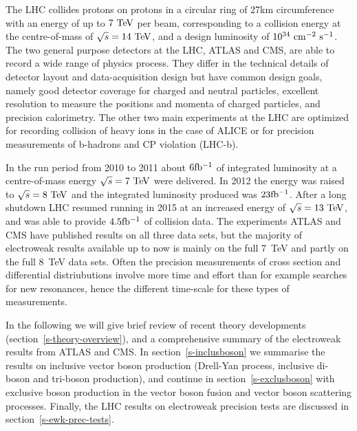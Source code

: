 The LHC collides protons on protons in a circular ring of 27\;km 
circumference with an energy of up to $7\TeV$ per beam, corresponding
to a collision energy at the centre-of-mass of $\rts=14\TeV$, and a 
design luminosity of $10^{34}\cm^{-2}\s^{-1}$. 
The two general purpose detectors at the LHC, ATLAS and CMS, are able to
record a wide range of physics process. They differ in the technical details of detector
layout and data-acquisition design but have common design goals, namely 
good detector coverage for charged and neutral particles, excellent resolution to measure
the positions and momenta of charged particles, and precision calorimetry. The other two
main experiments at the LHC are optimized for recording collision of heavy ions in the 
case of ALICE or for precision measurements of b-hadrons and CP violation (LHC-b).

In the run period from 2010 to 2011 about $6\mbox{fb$^{-1}$}$ of integrated
luminosity at a centre-of-mass energy $\rts=7\TeV$ were delivered. In 
2012 the energy was raised to $\rts=8\TeV$ and the integrated luminosity 
produced was $23\mbox{fb$^{-1}$}$. 
After a long shutdown LHC resumed running in 2015 at an increased energy of
$\rts=13\TeV$, and was able to provide $4.5\mbox{fb$^{-1}$}$ of collision data.
The experiments ATLAS and CMS have published results on all three data sets,
but the majority of electroweak results available up to now is mainly
on the full 7~TeV and partly on the full 8~TeV data sets. Often the precision
measurements of cross section and differential distriubutions involve more time
and effort than for example searches for new resonances, hence the different
time-scale for these types of measurements. 






In the following we will give brief review 
of recent theory developments (section~\ref{s-theory-overview}), and a comprehensive
summary of the electroweak results from ATLAS and CMS. In section~\ref{s-inclusboson} we summarise the
results on inclusive vector boson production (Drell-Yan process, inclusive di-boson and tri-boson production), 
and continue in section~\ref{s-exclusboson} with exclusive boson production in the vector boson fusion and vector 
boson scattering processes. Finally, the LHC results on electroweak precision tests are discussed 
in section~\ref{s-ewk-prec-tests}. 


